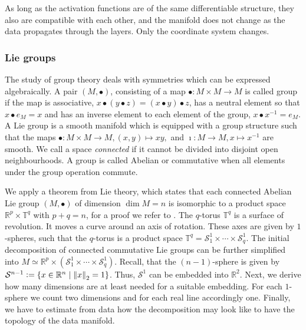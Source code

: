 \documentclass[runningheads,orivec]{llncs}
\begin{document}
As long as the activation functions are of the same differentiable structure, they also are compatible with each other, and the manifold does not change as the data propagates through the layers. Only the coordinate system changes.

\subsubsection{Lie groups} The study of group theory deals with symmetries which can be expressed algebraically. A pair $(M,\bullet)$, consisting of a map $\bullet: M\times M \rightarrow M$ is called group if the map is associative, $x \bullet (y \bullet z) = (x \bullet y) \bullet z$, has a neutral element so that $x \bullet e_{M} = x$ and has an inverse element to each element of the group, $x \bullet x^{-1} = e_{M}$. A Lie group is a smooth manifold which is equipped with a group structure such that the maps $\bullet:M \times  M \rightarrow  M, (x,y) \mapsto xy, $ and $\imath: M \rightarrow  M, x \mapsto x^{-1}$ are smooth. We call a space \emph{connected} if it cannot be divided into disjoint open neighbourhoods. A group is called Abelian or commutative when all elements under the group operation commute.

We apply a theorem from Lie theory, which states that each connected Abelian Lie group $(M,\bullet)$ of dimension $\dim M = n$ is isomorphic to a product space $\mathbb{R}^p \times \mathbb{T}^q$ with $p+q =n$, for a proof we refer to \cite[p.~116]{onishchik1993lie}. The $q$-torus $\mathbb{T}^q$ is a surface of revolution. It moves a curve around an axis of rotation. These axes are given by $1$-spheres, such that the $q$-torus is a product space $\mathbb{T}^q = \mathcal{S}^1_1 \times \cdots \times \mathcal{S}^1_q$. The initial decomposition of connected commutative Lie groups can be further simplified into $M \simeq \mathbb{R}^p \times (\mathcal{S}^1_1 \times \cdots \times \mathcal{S}^1_q)$. Recall, that the $(n-1)$-sphere is given by $\mathcal{S}^{n-1} := \{x \in \mathbb{R}^n \; \vert \; \norm{x}_2 = 1\}$. Thus, $\mathcal{S}^1$ can be embedded into $\mathbb{R}^2$. Next, we derive how many dimensions are at least needed for a suitable embedding. For each $1$-sphere we count two dimensions and for each real line accordingly one. Finally, we have to estimate from data how the decomposition may look like to have the topology of the data manifold.
\end{document}
